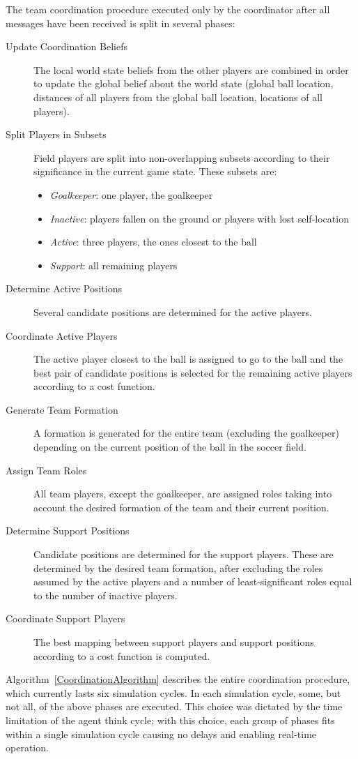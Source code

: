The team coordination procedure executed only by the coordinator after all messages have been received is split in several phases:
\begin{description}
\item[Update Coordination Beliefs] The local world state beliefs from the other players are combined in order to update the global belief about the world state (global ball location, distances of all players from the global ball location, locations of all players). 
\item[Split Players in Subsets] Field players are split into non-overlapping subsets according to their significance in the current game state. These subsets are:
\begin{itemize}
\item \textit{Goalkeeper}: one player, the goalkeeper
\item \textit{Inactive}: players fallen on the ground or players with lost self-location
\item \textit{Active}: three players, the ones closest to the ball
\item \textit{Support}: all remaining players
\end{itemize}
\item[Determine Active Positions] Several candidate positions are determined for the active players.
\item[Coordinate Active Players] The active player closest to the ball is assigned to go to the ball and the best pair of candidate positions is selected for the remaining active players according to a cost function.
\item[Generate Team Formation] A formation is generated for the entire team (excluding the goalkeeper) depending on the current position of the ball in the soccer field.
\item[Assign Team Roles] All team players, except the goalkeeper, are assigned roles taking into account the desired  formation of the team and their current position.
\item[Determine Support Positions]  Candidate positions are determined for the support players. These are determined by the desired team formation, after excluding the roles assumed by the active players and a number of least-significant roles equal to the number of inactive players. 
\item[Coordinate Support Players] The best mapping between support players and support positions according to a cost function is computed.
\end{description}
Algorithm~\ref{CoordinationAlgorithm} describes the entire coordination procedure, which currently lasts six simulation cycles. In each simulation cycle, some, but not all, of the above phases are executed. This choice was dictated by the time limitation of the agent think cycle; with this choice, each group of phases fits within a single simulation cycle causing no delays and enabling real-time operation. 

